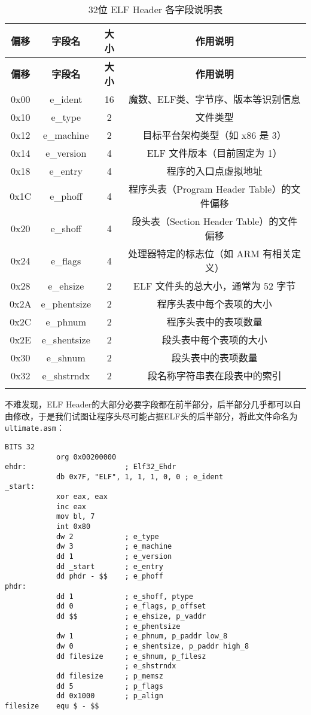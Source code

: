 \documentclass[a4paper, 11pt]{ctexart}
\begin{document}
\begin{longtable}{|c|c|c|c|}
\hline
\textbf{偏移} & \textbf{字段名} & \textbf{大小} & \textbf{作用说明} \\
\hline
\endfirsthead

\hline
\textbf{偏移} & \textbf{字段名} & \textbf{大小} & \textbf{作用说明} \\
\hline
\endhead

0x00 & e\_ident & 16 & 魔数、ELF类、字节序、版本等识别信息 \\
\hline
0x10 & e\_type & 2 & 文件类型 \\
\hline
0x12 & e\_machine & 2 & 目标平台架构类型（如 x86 是 3） \\
\hline
0x14 & e\_version & 4 & ELF 文件版本（目前固定为 1） \\
\hline
0x18 & e\_entry & 4 & 程序的入口点虚拟地址 \\
\hline
0x1C & e\_phoff & 4 & 程序头表（Program Header Table）的文件偏移 \\
\hline
0x20 & e\_shoff & 4 & 段头表（Section Header Table）的文件偏移 \\
\hline
0x24 & e\_flags & 4 & 处理器特定的标志位（如 ARM 有相关定义） \\
\hline
0x28 & e\_ehsize & 2 & ELF 文件头的总大小，通常为 52 字节 \\
\hline
0x2A & e\_phentsize & 2 & 程序头表中每个表项的大小 \\
\hline
0x2C & e\_phnum & 2 & 程序头表中的表项数量 \\
\hline
0x2E & e\_shentsize & 2 & 段头表中每个表项的大小 \\
\hline
0x30 & e\_shnum & 2 & 段头表中的表项数量 \\
\hline
0x32 & e\_shstrndx & 2 & 段名称字符串表在段表中的索引 \\
\hline
\caption{32位 ELF Header 各字段说明表}\label{tab:elf_header}
\end{longtable}
\vspace{-\baselineskip}

不难发现，ELF Header的大部分必要字段都在前半部分，后半部分几乎都可以自由修改，于是我们试图让程序头尽可能占据ELF头的后半部分，将此文件命名为\texttt{ultimate.asm}：

\begin{verbatim}
BITS 32
            org 0x00200000
ehdr:                       ; Elf32_Ehdr
            db 0x7F, "ELF", 1, 1, 1, 0, 0 ; e_ident
_start:
            xor eax, eax
            inc eax
            mov bl, 7
            int 0x80
            dw 2            ; e_type
            dw 3            ; e_machine
            dd 1            ; e_version
            dd _start       ; e_entry
            dd phdr - $$    ; e_phoff
phdr:
            dd 1            ; e_shoff, ptype
            dd 0            ; e_flags, p_offset
            dd $$           ; e_ehsize, p_vaddr
                            ; e_phentsize
            dw 1            ; e_phnum, p_paddr low_8
            dw 0            ; e_shentsize, p_paddr high_8
            dd filesize     ; e_shnum, p_filesz
                            ; e_shstrndx
            dd filesize     ; p_memsz
            dd 5            ; p_flags
            dd 0x1000       ; p_align
filesize    equ $ - $$
\end{verbatim}
\end{document}
